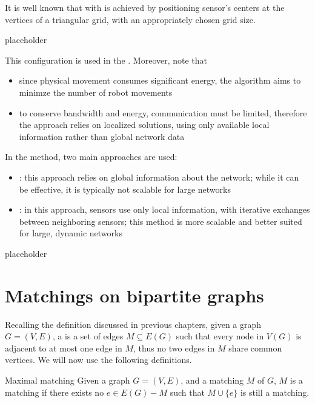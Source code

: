 \documentclass[a4paper, 12pt]{report}
\begin{document}
    It is well known that  with  is achieved by positioning sensor's centers at the vertices of a triangular grid, with an appropriately chosen grid size.

    placeholder 

    This configuration is used in the . Moreover, note that

    \begin{itemize}
        \item since physical movement consumes significant energy, the algorithm aims to minimze the number of robot movements
        \item to conserve bandwidth and energy, communication must be limited, therefore the approach relies on localized solutions, using only available local information rather than global network data
    \end{itemize}

    In the  method, two main approaches are used:

    \begin{itemize}
        \item {}: this approach relies on global information about the network; while it can be effective, it is typically not scalable for large networks
        \item {}: in this approach, sensors use only local information, with iterative exchanges between neighboring sensors; this method is more scalable and better suited for large, dynamic networks
    \end{itemize}

    placeholder 

    \section{Matchings on bipartite graphs}

    Recalling the definition discussed in previous chapters, given a graph $G = (V, E)$, a  is a set of edges $M \subseteq E(G)$ such that every node in $V(G)$ is adjacent to at most one edge in $M$, thus no two edges in $M$ share common vertices. We will now use the following definitions.

    \begin{frameddefn}{Maximal matching}
        Given a graph $G = (V, E)$, and a matching $M$ of $G$, $M$ is a  matching if there exists no $e \in E(G) - M$ such that $M \cup \{e\}$ is still a matching.
    \end{frameddefn}
\end{document}
